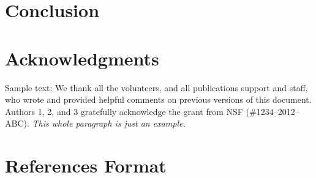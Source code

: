 \documentclass{sigchi}
\begin{document}
\section{Conclusion}



\section{Acknowledgments}

Sample text: We thank all the volunteers, and all publications support
and staff, who wrote and provided helpful comments on previous
versions of this document. Authors 1, 2, and 3 gratefully acknowledge
the grant from NSF (\#1234--2012--ABC). \textit{This whole paragraph is
  just an example.}

%
%
%
%
%
\balance{}

\section{References Format}




\end{document}
